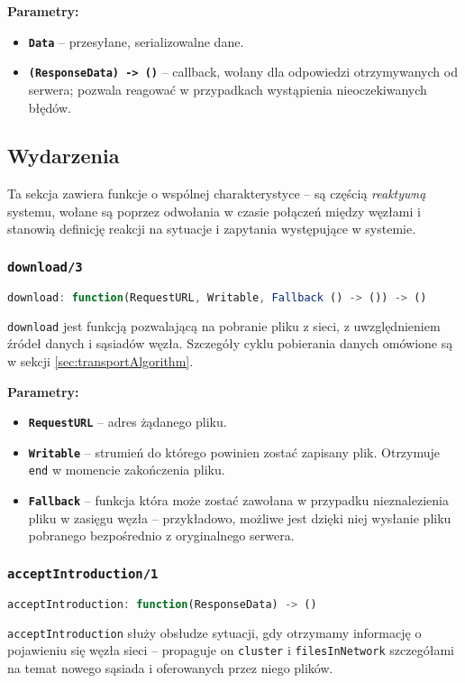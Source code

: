 \textbf{Parametry:}
\begin{itemize}
    \item \textbf{\texttt{Data}} -- przesyłane, serializowalne dane.
    \item \textbf{\texttt{(ResponseData) -> ()}} -- callback, wołany dla odpowiedzi otrzymywanych od serwera; pozwala reagować w przypadkach wystąpienia nieoczekiwanych błędów.
\end{itemize}

% 

\subsection{Wydarzenia}
\label{sec:events}
Ta sekcja zawiera funkcje o wspólnej charakterystyce -- są częścią {\em reaktywną} systemu, wołane są poprzez odwołania w czasie połączeń między węzłami i stanowią definicję reakcji na sytuacje i zapytania występujące w systemie.

% 

\subsubsection{\texttt{download/3}}
\begin{lstlisting}[language=javascript]
     download: function(RequestURL, Writable, Fallback () -> ()) -> ()
\end{lstlisting}
\texttt{download} jest funkcją pozwalającą na pobranie pliku z sieci, z uwzględnieniem źródeł danych i sąsiadów węzła. Szczegóły cyklu pobierania danych omówione są w sekcji \ref{sec:transportAlgorithm}.

\textbf{Parametry:}
\begin{itemize}
    \item \textbf{\texttt{RequestURL}} -- adres żądanego pliku.
    \item \textbf{\texttt{Writable}} -- strumień do którego powinien zostać zapisany plik. Otrzymuje \texttt{end} w momencie zakończenia pliku.
    \item \textbf{\texttt{Fallback}} -- funkcja która może zostać zawołana w przypadku nieznalezienia pliku w zasięgu węzła -- przykładowo, możliwe jest dzięki niej wysłanie pliku pobranego bezpośrednio z oryginalnego serwera.
\end{itemize}

% 

\subsubsection{\texttt{acceptIntroduction/1}}
\begin{lstlisting}[language=javascript]
    acceptIntroduction: function(ResponseData) -> ()
\end{lstlisting}
\texttt{acceptIntroduction} służy obsłudze sytuacji, gdy otrzymamy informację o pojawieniu się węzła sieci -- propaguje on \texttt{cluster} i \texttt{filesInNetwork} szczegółami na temat nowego sąsiada i oferowanych przez niego plików. 

